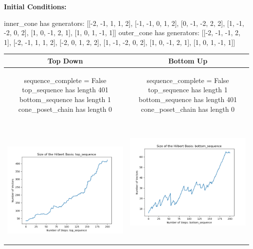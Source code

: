 \documentclass[10pt]{article}
\begin{document}
\textbf{Initial Conditions:}
\begin{SAGE}
inner_cone has generators: 
[[-2, -1, 1, 1, 2], [-1, -1, 0, 1, 2], [0, -1, -2, 2, 2], [1, -1, -2, 0, 2], [1, 0, -1, 2, 1], [1, 0, 1, -1, 1]]
outer_cone has generators: 
[[-2, -1, -1, 2, 1], [-2, -1, 1, 1, 2], [-2, 0, 1, 2, 2], [1, -1, -2, 0, 2], [1, 0, -1, 2, 1], [1, 0, 1, -1, 1]]

\end{SAGE}
\begin{tabular}{c|c}
\textbf{Top Down} & \textbf{Bottom Up} \\ \hline  
\begin{SAGE}
	sequence_complete = False
	top_sequence has length 401
	bottom_sequence has length 1
	cone_poset_chain has length 0
\end{SAGE} 
&
\begin{SAGE}
	sequence_complete = False
	top_sequence has length 1
	bottom_sequence has length 401
	cone_poset_chain has length 0
\end{SAGE} 
\\ \hline
\
\begin{minipage}{.45\textwidth}
\includegraphics[width=\textwidth]{"DATA/5d/6 generators 2 bound B/top_sequence SIZE"}
\end{minipage} &
\begin{minipage}{.45\textwidth}
\includegraphics[width=\textwidth]{"DATA/5d/6 generators 2 bound B bottomup/bottom_sequence SIZE"}

\end{minipage}
\end{tabular}
\end{document}
